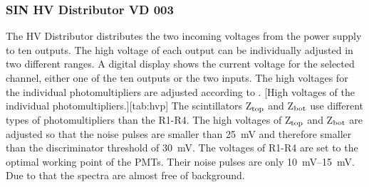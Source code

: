 \subsubsection*{SIN HV Distributor VD 003}
The HV Distributor distributes the two incoming voltages from the power supply to ten outputs. The high voltage of each output can be individually adjusted in two different ranges. A digital display shows the current voltage for the selected channel, either one of the ten outputs or the two inputs. The high voltages for the individual photomultipliers are adjusted according to .
[High voltages of the individual photomultipliers.][tab:hvp]
The scintillators Z$_{\text{top}}$ and Z$_{\text{bot}}$ use different types of photomultipliers than the R1-R4. The high voltages of Z$_{\text{top}}$ and Z$_{\text{bot}}$ are adjusted so that the noise pulses are smaller than \SI{25}{\milli\volt} and therefore smaller than the discriminator threshold of \SI{30}{\milli\volt}. The voltages of R1-R4 are set to the optimal working point of the \acp{PMT}. Their noise pulses are only \SIrange{10}{15}{\milli\volt}. Due to that the spectra are almost free of background. 









